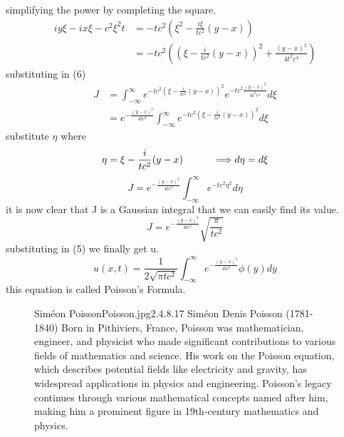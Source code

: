 \documentclass[]{article}
\begin{document}
simplifying the power by completing the square.
\begin{align*}
iy\xi -ix\xi - c^2 \xi^2 t &= -tc^2\left(\xi^2-\frac{i\xi}{tc^2}(y-x)\right)
\\
&= -tc^2\left({(\xi-\frac{i}{tc^2}(y-x))}^2 + \frac{{(y-x)}^2}{4t^2 c^4}\right)
\end{align*}
substituting in (6)
\begin{align*}
J   &= \int_{-\infty}^{\infty}e^{-tc^2{(\xi-\frac{i}{tc^2}(y-x))}^2}e^{-tc^2\frac{{(y-x)}^2}{4t^2 c^4}} d\xi
\\
    &=e^{-\frac{{(y-x)}^2}{4tc^2}} \int_{-\infty}^{\infty}e^{-tc^2{(\xi-\frac{i}{tc^2}(y-x))}^2} d\xi
\end{align*}
substitute  $\eta$ where 
\[
    \eta = \xi-\frac{i}{tc^2}(y-x)   \quad\quad\quad \Longrightarrow d\eta = d\xi   
\]
\[
    J =e^{-\frac{{(y-x)}^2}{4tc^2}} \int_{-\infty}^{\infty}e^{-tc^2\eta^2} d\eta 
\]
it is now clear that J is a Gaussian integral that we can easily find its value.
\[
    J = e^{-\frac{{(y-x)}^2}{4tc^2}}\sqrt{\frac{\pi}{tc^2}}    
\]
substituting in (5) we finally get u.
\[
    u(x,t) = \frac{1}{2\sqrt{\pi tc^2}}\int_{-\infty}^{\infty}e^{-\frac{{(y-x)}^2}{4tc^2}} \phi(y)dy    
\]
this equation is called Poisson's Formula.

\begin{figure}[b]
    \begin{enrichment}{Siméon Poisson}{Poisson.jpg}{2.4}{.8}{.17}
        Siméon Denis Poisson (1781-1840) Born in Pithiviers, France, Poisson was mathematician, engineer, and physicist who made significant contributions to various fields of mathematics and science. 
        His work on the Poisson equation, which describes potential fields like electricity and gravity, has widespread applications in physics and engineering. Poisson's legacy continues through various mathematical concepts named after him, making him a prominent figure in 19th-century mathematics and physics.
    \end{enrichment}    
\end{figure}

\setcounter{equation}{0}
\end{document}
